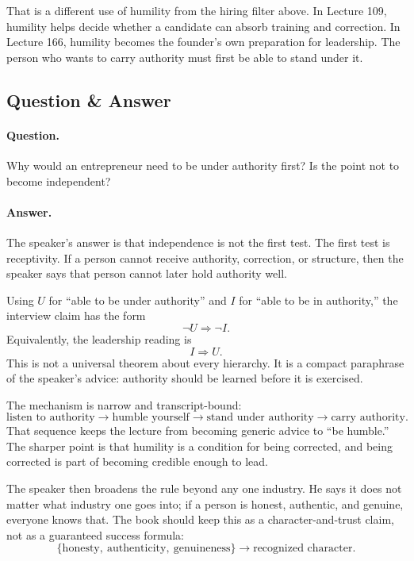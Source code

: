 \documentclass[11pt,oneside]{book}
\begin{document}
That is a different use of humility from the hiring filter above. In Lecture 109, humility helps decide whether a candidate can absorb training and correction. In Lecture 166, humility becomes the founder's own preparation for leadership. The person who wants to carry authority must first be able to stand under it.

\subsection{Question \& Answer}

\paragraph{Question.}
Why would an entrepreneur need to be under authority first? Is the point not to become independent?

\paragraph{Answer.}
The speaker's answer is that independence is not the first test. The first test is receptivity. If a person cannot receive authority, correction, or structure, then the speaker says that person cannot later hold authority well.

Using \(U\) for ``able to be under authority'' and \(I\) for ``able to be in authority,'' the interview claim has the form
\[
\neg U \Longrightarrow \neg I.
\]
Equivalently, the leadership reading is
\[
I \Longrightarrow U.
\]
This is not a universal theorem about every hierarchy. It is a compact paraphrase of the speaker's advice: authority should be learned before it is exercised.

The mechanism is narrow and transcript-bound:
\[
\text{listen to authority}
\longrightarrow
\text{humble yourself}
\longrightarrow
\text{stand under authority}
\longrightarrow
\text{carry authority}.
\]
That sequence keeps the lecture from becoming generic advice to ``be humble.'' The sharper point is that humility is a condition for being corrected, and being corrected is part of becoming credible enough to lead.

The speaker then broadens the rule beyond any one industry. He says it does not matter what industry one goes into; if a person is honest, authentic, and genuine, everyone knows that. The book should keep this as a character-and-trust claim, not as a guaranteed success formula:
\[
\{\text{honesty},\ \text{authenticity},\ \text{genuineness}\}
\longrightarrow
\text{recognized character}.
\]
\end{document}
